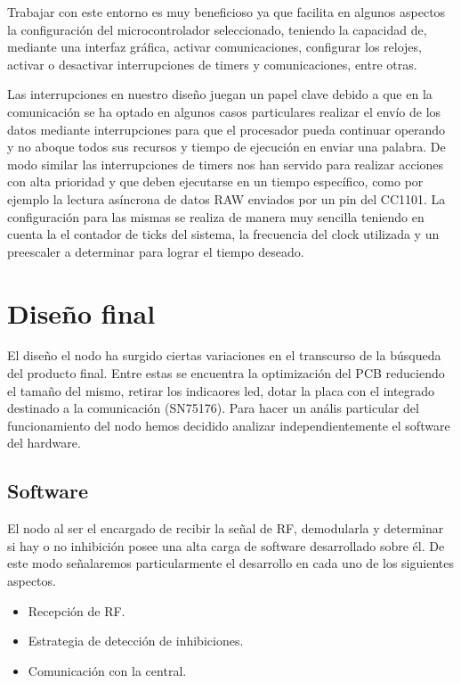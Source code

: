 Trabajar con este entorno es muy beneficioso ya que facilita en algunos aspectos la configuración del microcontrolador 
seleccionado, teniendo la capacidad de, mediante una interfaz gráfica, activar comunicaciones, configurar los relojes,
activar o desactivar interrupciones de timers y comunicaciones, entre otras. \par 
Las interrupciones en nuestro diseño juegan un papel clave debido a que en la comunicación se ha optado en algunos casos
particulares realizar el envío de los datos mediante interrupciones para que el procesador pueda continuar operando y no aboque 
todos sus recursos y tiempo de ejecución en enviar una palabra. De modo similar las interrupciones de timers nos han servido
para realizar acciones con alta prioridad y que deben ejecutarse en un tiempo específico, como por ejemplo la lectura asíncrona
de datos RAW enviados por un pin del CC1101. La configuración para las mismas se realiza de manera muy sencilla teniendo en 
cuenta la el contador de ticks del sistema, la frecuencia del clock utilizada y un preescaler a determinar para lograr el tiempo
deseado. \par 

\section{Diseño final}

El diseño el nodo ha surgido ciertas variaciones en el transcurso de la búsqueda del producto final. Entre estas se encuentra
la optimización del PCB reduciendo el tamaño del mismo, retirar los indicaores led, dotar la placa con el integrado destinado 
a la comunicación (SN75176). Para hacer un anális particular del funcionamiento del nodo hemos decidido analizar independientemente
el software del hardware.

\subsection{Software}

El nodo al ser el encargado de recibir la señal de RF, demodularla y determinar si hay o no inhibición posee una alta carga 
de software desarrollado sobre él. De este modo señalaremos particularmente el desarrollo en cada uno de los siguientes 
aspectos.

\begin{itemize}
	\item Recepción de RF.
	\item Estrategia de detección de inhibiciones.
	\item Comunicación con la central.
\end{itemize}


